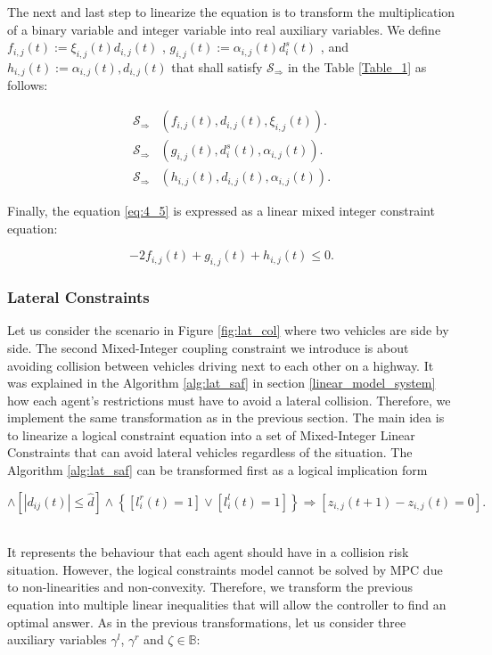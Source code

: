 The next and last step to linearize the equation is to transform the multiplication of a binary variable and integer variable into real auxiliary variables. We define $f_{i,j}(t) := \xi_{i,j}(t) d_{i,j}(t) $ , $g_{i,j}(t) := \alpha_{i,j}(t) d^s_i(t)$ , and $h_{i,j}(t) := \alpha_{i,j}(t) ,d_{i,j}(t)$ that shall satisfy $\mathcal{S}_\Rightarrow$ in the Table \ref{Table_1} as follows:

\begin{align}
\mathcal{S}_\Rightarrow & (f_{i,j}(t),d_{i,j}(t),\xi_{i,j}(t)).
\\
\mathcal{S}_\Rightarrow & (g_{i,j}(t),d^s_i(t),\alpha_{i,j}(t)).
\\
\mathcal{S}_\Rightarrow & (h_{i,j}(t),d_{i,j}(t),\alpha_{i,j}(t)).
\end{align}

Finally, the equation \ref{eq:4_5} is expressed as a linear mixed integer constraint equation:

\begin{equation}
    -2f_{i,j}(t)+g_{i,j}(t)+h_{i,j}(t) \leq 0.
\end{equation}




\subsubsection{Lateral Constraints}
Let us consider the scenario in Figure \ref{fig:lat_col} where two vehicles are side by side. The second Mixed-Integer coupling constraint we introduce is about avoiding collision between vehicles driving next to each other on a highway. It was explained in the Algorithm \ref{alg:lat_saf} in section \ref{linear_model_system} how each agent's restrictions must have to avoid a lateral collision. Therefore, we implement the same transformation as in the previous section. The main idea is to linearize a logical constraint equation into a set of Mixed-Integer Linear Constraints that can avoid lateral vehicles regardless of the situation. The Algorithm \ref{alg:lat_saf} can be transformed first as a logical implication form 


\begin{equation}
[\left |z_{i,j}(t)  \right |=1] \wedge [\left | d_{ij}(t) \right | \leq \hat{d}] \wedge \left \{ [l_i^r(t)=1] \vee[l_i^l(t)=1] \right \}\Rightarrow [z_{i,j}(t+1)-z_{i,j}(t)=0].
\label{eq:4_8}
\end{equation}

\\
It represents the behaviour that each agent should have in a collision risk situation. However, the logical constraints model cannot be solved by MPC due to non-linearities and non-convexity. Therefore, we transform the previous equation into multiple linear inequalities that will allow the controller to find an optimal answer. As in the previous transformations, let us consider three auxiliary variables $\gamma^l$, $\gamma^r$ and $\zeta \in \mathbb{B}:$


